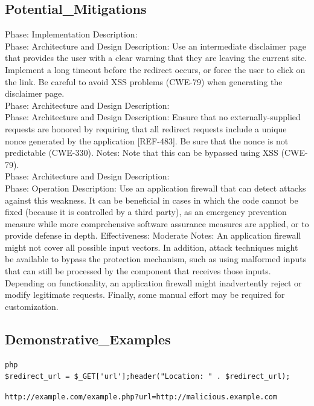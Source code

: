 \subsection*{Potential\_Mitigations}
Phase: Implementation
Description: 
                  \\
Phase: Architecture and Design
Description: Use an intermediate disclaimer page that provides the user with a clear warning that they are leaving the current site. Implement a long timeout before the redirect occurs, or force the user to click on the link. Be careful to avoid XSS problems (CWE-79) when generating the disclaimer page.\\
Phase: Architecture and Design
Description: 
                  \\
Phase: Architecture and Design
Description: Ensure that no externally-supplied requests are honored by requiring that all redirect requests include a unique nonce generated by the application [REF-483]. Be sure that the nonce is not predictable (CWE-330).
Notes: Note that this can be bypassed using XSS (CWE-79).\\
Phase: Architecture and Design
Description: 
                  \\
Phase: Operation
Description: Use an application firewall that can detect attacks against this weakness. It can be beneficial in cases in which the code cannot be fixed (because it is controlled by a third party), as an emergency prevention measure while more comprehensive software assurance measures are applied, or to provide defense in depth.
Effectiveness: Moderate
Notes: An application firewall might not cover all possible input vectors. In addition, attack techniques might be available to bypass the protection mechanism, such as using malformed inputs that can still be processed by the component that receives those inputs. Depending on functionality, an application firewall might inadvertently reject or modify legitimate requests. Finally, some manual effort may be required for customization.\\
\subsection*{Demonstrative\_Examples}
\begin{lstlisting}[breaklines=true,postbreak=\mbox{$\hookrightarrow$\space}]
php
$redirect_url = $_GET['url'];header("Location: " . $redirect_url);
\end{lstlisting}

\begin{lstlisting}[breaklines=true,postbreak=\mbox{$\hookrightarrow$\space}]
http://example.com/example.php?url=http://malicious.example.com
\end{lstlisting}

